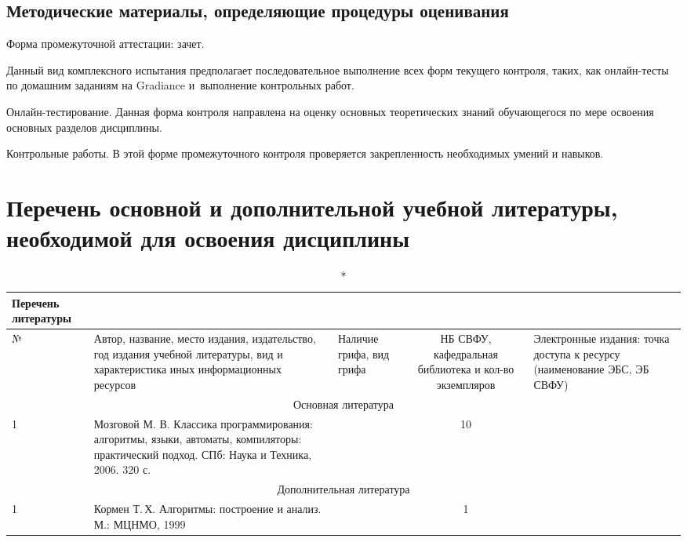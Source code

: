 \documentclass[a4paper,12pt]{article}
\begin{document}
\subsection{Методические материалы, определяющие процедуры оценивания}

Форма промежуточной аттестации: зачет.
\par
Данный вид комплексного испытания предполагает последовательное выполнение
всех форм текущего контроля, таких, как онлайн-тесты по домашним заданиям на Gradiance
и~выполнение контрольных работ.
\par
Онлайн-тестирование. Данная форма контроля направлена на оценку основных
теоретических знаний обучающегося по мере освоения основных разделов дисциплины.
\par
Контрольные работы. В этой форме промежуточного контроля проверяется закрепленность
необходимых умений и навыков.



\newpage
\section{Перечень основной и дополнительной учебной литературы, необходимой для освоения дисциплины}

  \begin{longtable}{|l|p{7cm}|p{18mm}|c|p{32mm}|}
  \caption*{Перечень литературы}\\
  \hline
  № & 
  \centering\small\arraybackslash Автор, название, место издания, издательство, год издания учебной литературы, вид и характеристика иных информационных ресурсов &
  \multicolumn{1}{p{18mm}|}{\centering\small\arraybackslash Наличие грифа, вид грифа} &
  \multicolumn{1}{p{21mm}|}{\centering\small\arraybackslash НБ СВФУ, кафедральная библиотека и кол-во экземпляров} & 
  \centering\small\arraybackslash Электронные издания: точка доступа к ресурсу (наименование ЭБС, ЭБ СВФУ)\\
  \hline
  \multicolumn{5}{|c|}{Основная литература}\\
  \hline
  1 &\raggedright\arraybackslash Мозговой М. В. Классика программирования: алгоритмы, языки, автоматы, компиляторы: практический подход. СПб: Наука и Техника, 2006. 320 с. & & 10 &
  \\
  \hline
  
  \multicolumn{5}{|c|}{Дополнительная литература}\\
  \hline
  1 &\raggedright\arraybackslash Кормен Т.\,Х. Алгоритмы: построение и анализ. М.: МЦНМО, 1999 & & 1 & 
  \\
  \hline
  
  \end{longtable}
  
\end{document}
